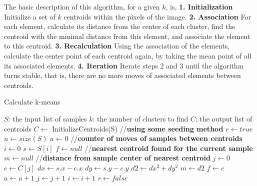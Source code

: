 \documentclass[12pt]{article}
\begin{document}
The basic description of this algorithm, for a given $k$, is, \newline
\textbf{1. Initialization} Initialize a set of $k$ centroids within the pixels of the image. \newline
\textbf{2. Association} For each element, calculate its distance from the center of each cluster, find the centroid with the minimal distance from this element, and associate the element to this centroid. \newline
\textbf{3. Recalculation} Using the association of the elements, calculate the center point of each centroid again, by taking the mean point of all its associated elements. \newline
\textbf{4. Iteration} Iterate steps 2 and 3 until the algorithm turns stable, that is, there are no more moves of associated elements between centroids. \newline

\begin{algorithm}
\caption{Calculate k-means}
\begin{algorithmic} 
\REQUIRE $S$: the input list of samples \newline
$k$: the number of clusters to find
\ENSURE $C$: the output list of centroids
\STATE $C \leftarrow $ InitializeCentroids(S) //\textbf{using some seeding method}
\STATE $r \leftarrow true$
\STATE $n \leftarrow size(S)$
\newline
{}
\STATE $a \leftarrow 0$ //\textbf{counter of moves of samples between centroids}
\STATE $i \leftarrow 0$
\STATE $s \leftarrow S[i]$
\newline
\STATE $f \leftarrow null$ //\textbf{nearest centroid found for the current sample}
\STATE $m \leftarrow null$ //\textbf{distance from sample center of nearest centroid}
\newline
\STATE $j \leftarrow 0$
\STATE $c \leftarrow C[j]$
\newline
\STATE $dx \leftarrow s.x - c.x$
\STATE $dy \leftarrow s.y - c.y$
\STATE $d2 \leftarrow dx^2+dy^2$
\newline
{}
\STATE $m \leftarrow d2$
\STATE $f \leftarrow c$
\ENDIF
\newline
{}
\STATE $a \leftarrow a+1$
\ENDIF
\newline
\STATE $j \leftarrow j+1$
\ENDWHILE
\newline
\STATE $i \leftarrow i+1$
\ENDWHILE
\newline
{}
\STATE $r \leftarrow false$
\ENDIF
\newline
\ENDWHILE
\end{algorithmic}
\end{algorithm}
\end{document}
